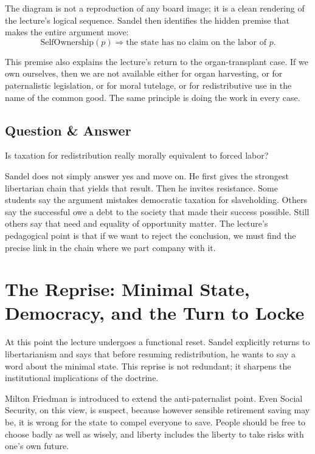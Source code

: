 The diagram is not a reproduction of any board image; it is a clean rendering of the lecture's logical sequence. Sandel then identifies the hidden premise that makes the entire argument move:
\begin{equation}
\text{SelfOwnership}(p)\Longrightarrow \text{the state has no claim on the labor of }p.
\end{equation}

This premise also explains the lecture's return to the organ-transplant case. If we own ourselves, then we are not available either for organ harvesting, or for paternalistic legislation, or for moral tutelage, or for redistributive use in the name of the common good. The same principle is doing the work in every case.

\subsection{Question \& Answer}

Is taxation for redistribution really morally equivalent to forced labor?

Sandel does not simply answer yes and move on. He first gives the strongest libertarian chain that yields that result. Then he invites resistance. Some students say the argument mistakes democratic taxation for slaveholding. Others say the successful owe a debt to the society that made their success possible. Still others say that need and equality of opportunity matter. The lecture's pedagogical point is that if we want to reject the conclusion, we must find the precise link in the chain where we part company with it.

\section{The Reprise: Minimal State, Democracy, and the Turn to Locke}

At this point the lecture undergoes a functional reset. Sandel explicitly returns to libertarianism and says that before resuming redistribution, he wants to say a word about the minimal state. This reprise is not redundant; it sharpens the institutional implications of the doctrine.

Milton Friedman is introduced to extend the anti-paternalist point. Even Social Security, on this view, is suspect, because however sensible retirement saving may be, it is wrong for the state to compel everyone to save. People should be free to choose badly as well as wisely, and liberty includes the liberty to take risks with one's own future.

